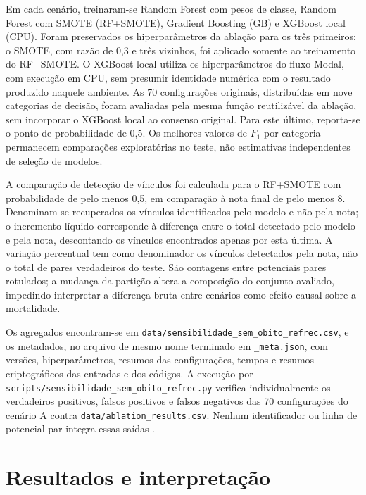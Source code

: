 Em cada cenário, treinaram-se Random Forest com pesos de classe, Random Forest com SMOTE (RF+SMOTE), Gradient Boosting (GB) e XGBoost local (CPU). Foram preservados os hiperparâmetros da ablação para os três primeiros; o SMOTE, com razão de 0,3 e três vizinhos, foi aplicado somente ao treinamento do RF+SMOTE. O XGBoost local utiliza os hiperparâmetros do fluxo Modal, com execução em CPU, sem presumir identidade numérica com o resultado produzido naquele ambiente. As 70 configurações originais, distribuídas em nove categorias de decisão, foram avaliadas pela mesma função reutilizável da ablação, sem incorporar o XGBoost local ao consenso original. Para este último, reporta-se o ponto de probabilidade de 0,5. Os melhores valores de $F_1$ por categoria permanecem comparações exploratórias no teste, não estimativas independentes de seleção de modelos.

A comparação de detecção de vínculos foi calculada para o RF+SMOTE com probabilidade de pelo menos 0,5, em comparação à nota final de pelo menos 8. Denominam-se recuperados os vínculos identificados pelo modelo e não pela nota; o incremento líquido corresponde à diferença entre o total detectado pelo modelo e pela nota, descontando os vínculos encontrados apenas por esta última. A variação percentual tem como denominador os vínculos detectados pela nota, não o total de pares verdadeiros do teste. São contagens entre potenciais pares rotulados; a mudança da partição altera a composição do conjunto avaliado, impedindo interpretar a diferença bruta entre cenários como efeito causal sobre a mortalidade.

Os agregados encontram-se em \texttt{data/sensibilidade\_sem\_obito\_refrec.csv}, e os metadados, no arquivo de mesmo nome terminado em \texttt{\_meta.json}, com versões, hiperparâmetros, resumos das configurações, tempos e resumos criptográficos das entradas e dos códigos. A execução por \texttt{scripts/sensibilidade\_sem\_obito\_refrec.py} verifica individualmente os verdadeiros positivos, falsos positivos e falsos negativos das 70 configurações do cenário A contra \texttt{data/ablation\_results.csv}. Nenhum identificador ou linha de potencial par integra essas saídas \cite{Jardim2026phdrepo}.

\section{Resultados e interpretação}



